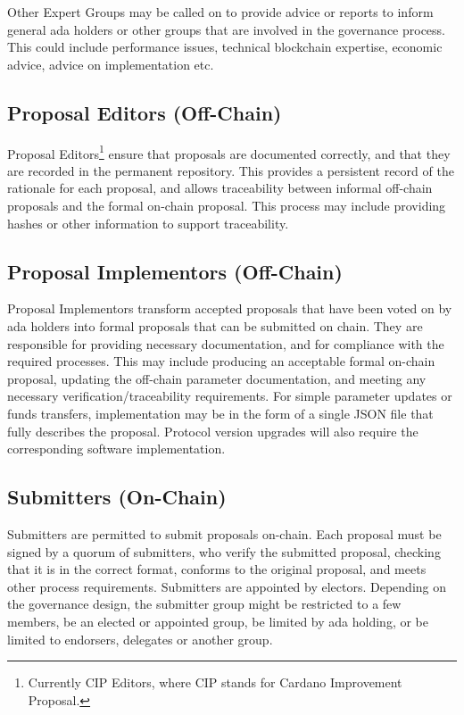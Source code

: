 Other Expert Groups may be called on to provide advice or reports to inform general ada holders or other groups that are involved in the
governance process.  This could include performance issues, technical blockchain expertise, economic advice, advice on implementation etc.

\subsection{Proposal Editors (Off-Chain)}

Proposal Editors\footnote{Currently CIP Editors, where CIP stands for Cardano Improvement Proposal.} ensure that proposals are documented correctly, and that they are recorded in the
permanent repository.
This provides a persistent record of the rationale for each proposal, and allows traceability between informal off-chain
proposals and the formal on-chain proposal.  This process may include providing hashes or other information to support traceability.

\subsection{Proposal Implementors (Off-Chain)}

Proposal Implementors transform accepted proposals that have been voted on by ada holders into formal proposals that can be submitted on chain.
They are responsible for providing necessary documentation, and for compliance with the required processes.  This may include producing an acceptable formal on-chain proposal,
updating the off-chain parameter documentation,
and meeting any necessary verification/traceability requirements.  For simple parameter updates or funds transfers, implementation may be in the form of a single JSON
file that fully describes the proposal. Protocol version upgrades will also require the corresponding software implementation.

\subsection{Submitters (On-Chain)}

Submitters are permitted to submit proposals on-chain.  Each proposal must be signed by a quorum of submitters, who verify the submitted
proposal, checking that it is in the correct format, conforms to the original proposal, and meets other process requirements.
Submitters are appointed by electors.  Depending on the governance design, the submitter group might be restricted to a few members,
be an elected or appointed group, be limited by ada holding, or be limited to endorsers, delegates or another group.

